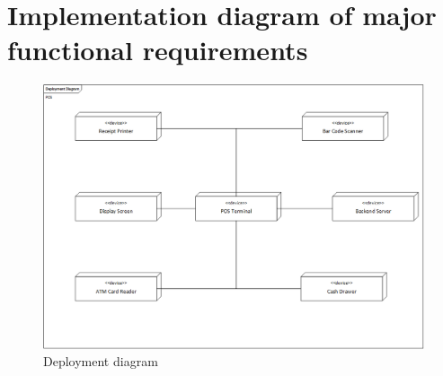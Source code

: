 \section{Implementation diagram of major functional requirements}

\begin{figure}[H]
  \centering
  \includegraphics[width=\textwidth]{./assets/t3/deploy.png}
  \caption{Deployment diagram}
\end{figure}
